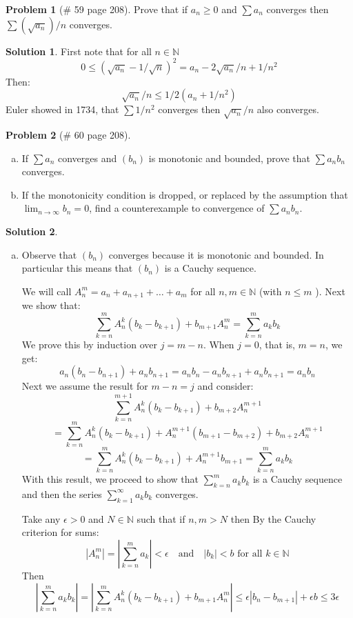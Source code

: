 \documentclass{article}
\theoremstyle{definition}
\newtheorem*{soln}{Solution}
\newtheorem*{prob}{Problem}
\theoremstyle{theorem}
\newcommand{\N}{\mathbb{N}}
\begin{document}
\begin{prob}[\# 59  page 208]
    Prove that if $a_n\geq 0$ and $\sum a_n$ converges then $\sum(\sqrt{a_n})/n$ converges.
\end{prob}
\begin{soln}
   First note that for all $n\in \N$
    $$0\leq (\sqrt{a_n}-1/\sqrt n)^2 = a_n - 2\sqrt{a_n}/n + 1/n^2$$
    Then:
    $$\sqrt{a_n}/n\leq 1/2(a_n +1/n^2)$$
    Euler showed in 1734, that $\sum 1/n^2$ converges then $\sqrt{a_n}/n$ also converges.
\end{soln}
\vspace{1in}

\begin{prob}[\# 60  page 208]
    \begin{enumerate}[(a)]
        \item If $\sum a_n$ converges and $(b_n)$ is monotonic and bounded, prove that $\sum a_nb_n$ converges.
        \item If the monotonicity condition is dropped, or replaced by the assumption that $\lim_{n\to \infty }b_n =0$, find a counterexample to convergence of $\sum a_n b_n$.
    \end{enumerate}
\end{prob}
\begin{soln}
    \begin{enumerate}[(a)]
        \item Observe that $(b_n)$ converges because it is monotonic and bounded. In particular this means that $(b_n)$ is a Cauchy sequence.
           
            We will call $A_n^m = a_n+ a_{n+1 }+\ldots + a_m$ for all $n,m\in\N$ (with $n\leq m$ ). Next we show that:
            $$\sum_{k=n }^m A_n^k (b_k-b_{k+1 }) + b_{m+1 }A_n^m  = \sum_{k=n }^{m } a_kb_k$$
            We prove this by induction over $j = m-n$. When $j=0$, that is, $m=n$, we get:
            $$a_n(b_n-b_{n+1 })+a_nb_{n+1 } = a_n b_n - a_nb_{n+1 } +a_nb_{n+1 }=a_nb_n$$
            Next we assume the result for  $m-n = j$ and consider:
            $$\sum_{k=n }^{m+1 }A_n^k(b_k-b_{k+1 }) + b_{m+2 }A_n^{m+1 }$$
            $$=\sum_{k=n }^{m }A_n^k(b_k-b_{k+1 }) + A_n^{m+1 }(b_{m+1 }- b_{m+2 })  + b_{m+2 }A_n^{m+1 } $$
            $$=\sum_{k=n }^{m }A_n^k(b_k-b_{k+1 }) + A_n^{m+1 }b_{m+1 } = \sum_{k=n }^ma_kb_k$$
            With this result, we proceed to show that $\sum_{k=n }^ma_kb_k$ is a Cauchy sequence and then the series $\sum_{k=1 }^\infty a_kb_k$ converges.

            Take any $\epsilon >0$ and $N\in \N$ such that if $n,m>N$ then By the Cauchy criterion for sums:
            $$|A_n^m| = \left|\sum_{k=n }^m a_k \right| <\epsilon \quad \text{and} \quad |b_k|<b \text{ for all }k\in \N$$
            Then 
            $$\left| \sum_{k=n }^m a_k b_k\right| = \left| \sum_{k=n }^m A_n^k (b_k-b_{k+1 }) + b_{m+1 }A_n^m \right| \leq \epsilon|b_n-b_{m+1 }| + \epsilon b \leq 3\epsilon$$ 
    \end{enumerate}

\end{soln}
\vspace{1in}
\end{document}
